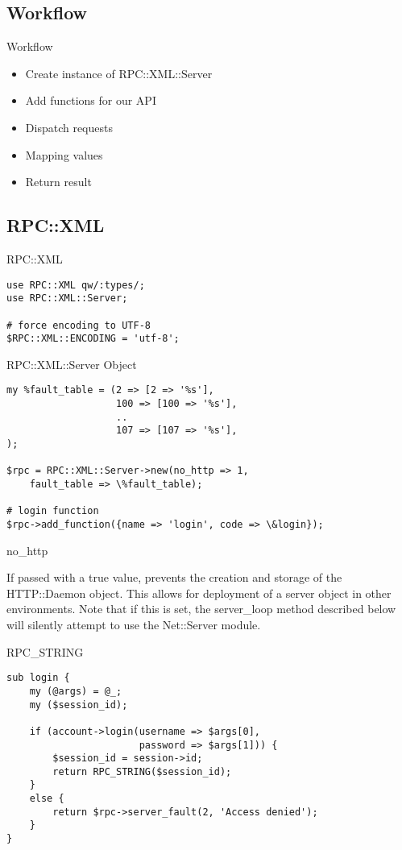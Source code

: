 \subsection{Workflow}
\begin{frame}{Workflow}
\begin{itemize}
\item Create instance of RPC::XML::Server
\item Add functions for our API
\item Dispatch requests
\item Mapping values
\item Return result
\end{itemize}
\end{frame}

\subsection{RPC::XML}
\begin{frame}[fragile]{RPC::XML}
\begin{lstlisting}
use RPC::XML qw/:types/;
use RPC::XML::Server;

# force encoding to UTF-8
$RPC::XML::ENCODING = 'utf-8';
\end{lstlisting}
\end{frame}

\begin{frame}[fragile]{RPC::XML::Server Object}
\begin{lstlisting}
my %fault_table = (2 => [2 => '%s'],
                   100 => [100 => '%s'],
                   ..
                   107 => [107 => '%s'],
);

$rpc = RPC::XML::Server->new(no_http => 1, 
    fault_table => \%fault_table);

# login function
$rpc->add_function({name => 'login', code => \&login});
\end{lstlisting}
\end{frame}

no_http

If passed with a true value, prevents the creation and storage of the
HTTP::Daemon object. This allows for deployment of a server object in other
environments. Note that if this is set, the server_loop method described
below will silently attempt to use the Net::Server module.

\begin{frame}[fragile]{RPC\_STRING}
\begin{lstlisting}
sub login {
    my (@args) = @_;
    my ($session_id);

    if (account->login(username => $args[0],
                       password => $args[1])) {
        $session_id = session->id;
        return RPC_STRING($session_id);
    }
    else {
        return $rpc->server_fault(2, 'Access denied');
    }
}
\end{lstlisting}
\end{frame}

